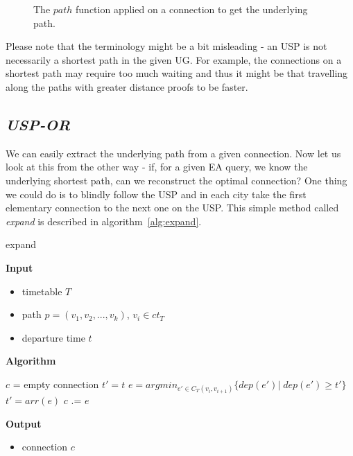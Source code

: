 \begin{figure}[h!]
	\begin{center}
	\end{center}
	\caption{\label{fig:pathfunc} The $path$ function applied on a connection to get the underlying path.}
\end{figure}

\noindent Please note that the terminology might be a bit misleading - an USP is not necessarily a shortest path in the given UG. For example, the connections on a shortest path may require too much waiting and thus it might be that travelling along the paths with greater distance proofs to be faster.
	    
\subsection{\textit{USP-OR}}

	We can easily extract the underlying path from a given connection. Now let us look at this from the other way - if, for a given EA query, we know the underlying shortest path, can we reconstruct the optimal connection? One thing we could do is to blindly follow the USP and in each city take the first elementary connection to the next one on the USP. This simple method called \textit{expand} is described in algorithm~\ref{alg:expand}. 
	
	\color{algcolor}
	\begin{algorithm}[H]
		\color{inalgcolor}
		\caption{expand}
		\label{alg:expand}
		\textbf{Input} 
		\begin{itemize}
			\item timetable $T$
			\item path $p = (v_{1}, v_{2}, ..., v_{k})$, $v_{i} \in ct_{T}$
			\item departure time $t$
		\end{itemize}
		\textbf{Algorithm}
		\begin{algorithmic}[1]
			\STATE $c$ = empty connection
			\STATE $t' = t$
				\STATE $e = argmin_{e' \in C_{T}(v_{i}, v_{i + 1})} \{dep(e')|\; dep(e') \geq t'\}$ 
				\STATE $t' = arr(e)$
				\STATE $c$ .= $e$ 
			\ENDFOR
		\end{algorithmic}
		\textbf{Output}
		\begin{itemize}
			\item connection $c$
		\end{itemize}
	\end{algorithm}
	\color{black}	
	
